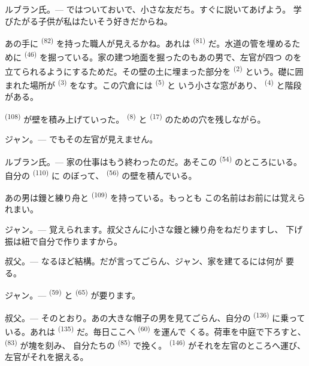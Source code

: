 \VUsaut{3.0mm}

\textsc{ルブラン氏}。--- ではついておいで、小さな友だち。すぐに説いてあげよう。
学びたがる子供が私はたいそう好きだからね。

あの手に \textsuperscript{(82)} を持った職人が見えるかね。あれは
 \textsuperscript{(81)} だ。水道の管を埋めるために
\textsuperscript{(46)} を掘っている。家の建つ地面を掘ったのもあの男で、左官が四つ
のを立てられるようにするためだ。その壁の土に埋まった部分を
 \textsuperscript{(2)} という。礎に囲まれた場所が
\textsuperscript{(3)} をなす。この穴倉には \textsuperscript{(5)} と
いう小さな窓があり、 \textsuperscript{(4)} と階段がある。

 \textsuperscript{(108)} が壁を積み上げていった。
\textsuperscript{(8)} と \textsuperscript{(17)} のための穴を残しながら。

\textsc{ジャン}。--- でもその左官が見えません。

\textsc{ルブラン氏}。--- 家の仕事はもう終わったのだ。あそこの
\textsuperscript{(54)} のところにいる。自分の \textsuperscript{(110)} に
のぼって、 \textsuperscript{(56)} の壁を積んでいる。

あの男は鏝と練り舟と \textsuperscript{(109)} を持っている。もっとも
この名前はお前には覚えられまい。

\textsc{ジャン}。--- 覚えられます。叔父さんに小さな鏝と練り舟をねだりますし、
下げ振は紐で自分で作りますから。

\VUsaut{3.0mm}
\VUsaut{3.0mm}

\textsc{叔父}。--- なるほど結構。だが言ってごらん、ジャン、家を建てるには何が
要る。

\textsc{ジャン}。---  \textsuperscript{(59)} と
\textsuperscript{(65)} が要ります。

\textsc{叔父}。--- そのとおり。あの大きな帽子の男を見てごらん、自分の
 \textsuperscript{(136)} に乗っている。あれは
\textsuperscript{(135)} だ。毎日ここへ \textsuperscript{(60)} を運んで
くる。荷車を中庭で下ろすと、 \textsuperscript{(83)} が塊を刻み、
自分たちの \textsuperscript{(85)} で挽く。
\textsuperscript{(146)} がそれを左官のところへ運び、左官がそれを据える。

